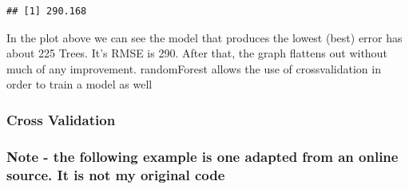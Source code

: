 \documentclass[]{article}
\begin{document}
\begin{verbatim}
## [1] 290.168
\end{verbatim}

In the plot above we can see the model that produces the lowest (best)
error has about 225 Trees. It's RMSE is 290. After that, the graph
flattens out without much of any improvement. randomForest allows the
use of crossvalidation in order to train a model as well

\subsubsection{Cross Validation}\label{cross-validation}

\subsubsection{Note - the following example is one adapted from an
online source. It is not my original
code}\label{note---the-following-example-is-one-adapted-from-an-online-source.-it-is-not-my-original-code}
\end{document}
